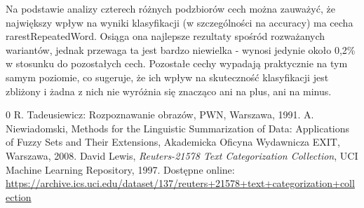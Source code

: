 \documentclass{article}
\begin{document}
	Na podstawie analizy czterech różnych podzbiorów cech można zauważyć, że największy wpływ na wyniki klasyfikacji (w szczególności na accuracy) ma cecha rarestRepeatedWord. Osiąga ona najlepsze rezultaty spośród rozważanych wariantów, jednak przewaga ta jest bardzo niewielka - wynosi jedynie około 0,2\% w stosunku do pozostałych cech.
	Pozostałe cechy wypadają praktycznie na tym samym poziomie, co sugeruje, że ich wpływ na skuteczność klasyfikacji jest zbliżony i żadna z nich nie wyróżnia się znacząco ani na plus, ani na minus.


		\begin{thebibliography}{0}
			 R. Tadeusiewicz: Rozpoznawanie obrazów, PWN, Warszawa, 1991.  
			 A. Niewiadomski, Methods for the Linguistic Summarization of Data: Applications of Fuzzy Sets and Their Extensions, Akademicka Oficyna Wydawnicza EXIT, Warszawa, 2008.
			 David Lewis, \textit{Reuters-21578 Text Categorization Collection}, UCI Machine Learning Repository, 1997. Dostępne online: \url{https://archive.ics.uci.edu/dataset/137/reuters+21578+text+categorization+collection}
		\end{thebibliography}
	
\end{document}
